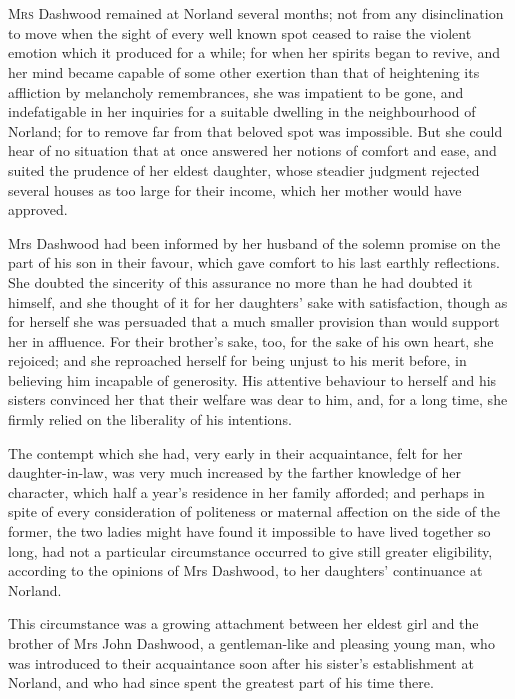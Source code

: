 \chapter[Chapter \thechapter]{}
\lettrine[lraise=0.3]{M}{rs} Dashwood remained at Norland several months; not from any disinclination to move when the sight of every well known spot ceased to raise the violent emotion which it produced for a while; for when her spirits began to revive, and her mind became capable of some other exertion than that of heightening its affliction by melancholy remembrances, she was impatient to be gone, and indefatigable in her inquiries for a suitable dwelling in the neighbourhood of Norland; for to remove far from that beloved spot was impossible. But she could hear of no situation that at once answered her notions of comfort and ease, and suited the prudence of her eldest daughter, whose steadier judgment rejected several houses as too large for their income, which her mother would have approved.

Mrs Dashwood had been informed by her husband of the solemn promise on the part of his son in their favour, which gave comfort to his last earthly reflections. She doubted the sincerity of this assurance no more than he had doubted it himself, and she thought of it for her daughters' sake with satisfaction, though as for herself she was persuaded that a much smaller provision than  would support her in affluence. For their brother's sake, too, for the sake of his own heart, she rejoiced; and she reproached herself for being unjust to his merit before, in believing him incapable of generosity. His attentive behaviour to herself and his sisters convinced her that their welfare was dear to him, and, for a long time, she firmly relied on the liberality of his intentions.

The contempt which she had, very early in their acquaintance, felt for her daughter-in-law, was very much increased by the farther knowledge of her character, which half a year's residence in her family afforded; and perhaps in spite of every consideration of politeness or maternal affection on the side of the former, the two ladies might have found it impossible to have lived together so long, had not a particular circumstance occurred to give still greater eligibility, according to the opinions of Mrs Dashwood, to her daughters' continuance at Norland.

This circumstance was a growing attachment between her eldest girl and the brother of Mrs John Dashwood, a gentleman-like and pleasing young man, who was introduced to their acquaintance soon after his sister's establishment at Norland, and who had since spent the greatest part of his time there.

